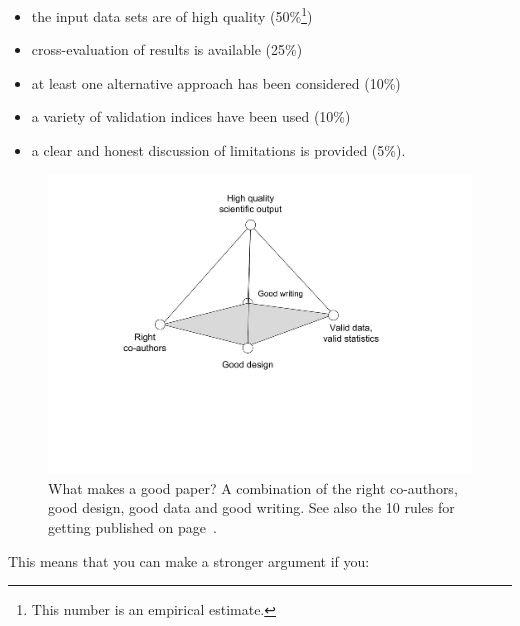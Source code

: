 \documentclass[graybox,envcountchap,sectrefs,UStrade]{svmono}
\begin{document}
\begin{itemize}\renewcommand{\labelitemi}{$\checkmark$}
  \item the input data sets are of high quality (50\%\footnote{This number is an empirical estimate.})
  \item cross-evaluation of results is available (25\%)
  \item at least one alternative approach has been considered (10\%)
  \item a variety of validation indices have been used (10\%)
  \item a clear and honest discussion of limitations is provided (5\%).
\end{itemize}

\begin{figure}[!hbt]
 \begin{center}
  \includegraphics[width=.6\textwidth]{Fig_what_makes_good_paper.pdf}
 \caption{What makes a good paper? A combination of the right co-authors, good design, good data and good writing. See also the 10 rules for getting published on page~\pageref{sec:bourne_rules}.} \label{Fig:what_makes_good_paper}
 \end{center}
\end{figure}

This means that you can make a stronger argument if you:
\end{document}
